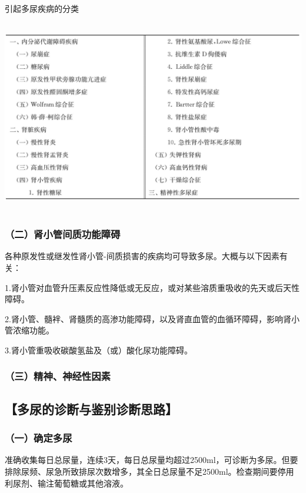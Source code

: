 \begin{table}[htbp]
\centering
\caption{引起多尿疾病的分类}
\label{tab35-3}
\includegraphics[width=5.88542in,height=3.33333in]{./images/Image00213.jpg}
\end{table}

\subsubsection{（二）肾小管间质功能障碍}

各种原发性或继发性肾小管-间质损害的疾病均可导致多尿。大概与以下因素有关：

1.肾小管对血管升压素反应性降低或无反应，或对某些溶质重吸收的先天或后天性障碍。

2.肾小管、髓袢、肾髓质的高渗功能障碍，以及肾直血管的血循环障碍，影响肾小管浓缩功能。

3.肾小管重吸收碳酸氢盐及（或）酸化尿功能障碍。

\subsubsection{（三）精神、神经性因素}

\subsection{【多尿的诊断与鉴别诊断思路】}

\subsubsection{（一）确定多尿}

准确收集每日总尿量，连续3天，每日总尿量均超过2500ml，可诊断为多尿。但要排除尿频、尿急所致排尿次数增多，其全日总尿量不足2500ml。检查期间要停用利尿剂、输注葡萄糖或其他溶液。

